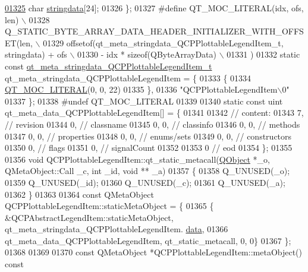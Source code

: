 \begin{DoxyCode}
\hypertarget{a00067_source_l01325}{}\hyperlink{a00067_a25e998eb002b6a9f9e969afa5247748f}{01325}     \textcolor{keywordtype}{char} \hyperlink{a00067_a25e998eb002b6a9f9e969afa5247748f}{stringdata}[24];
01326 \};
01327 \textcolor{preprocessor}{#define QT\_MOC\_LITERAL(idx, ofs, len) \(\backslash\)}
01328 \textcolor{preprocessor}{    Q\_STATIC\_BYTE\_ARRAY\_DATA\_HEADER\_INITIALIZER\_WITH\_OFFSET(len, \(\backslash\)}
01329 \textcolor{preprocessor}{    offsetof(qt\_meta\_stringdata\_QCPPlottableLegendItem\_t, stringdata) + ofs \(\backslash\)}
01330 \textcolor{preprocessor}{        - idx * sizeof(QByteArrayData) \(\backslash\)}
01331 \textcolor{preprocessor}{    )}
01332 \textcolor{keyword}{static} \textcolor{keyword}{const} \hyperlink{a00067_d3/de5/a00209}{qt\_meta\_stringdata\_QCPPlottableLegendItem\_t} 
      qt\_meta\_stringdata\_QCPPlottableLegendItem = \{
01333     \{
01334 \hyperlink{a00067_a75bb9482d242cde0a06c9dbdc6b83abe}{QT\_MOC\_LITERAL}(0, 0, 22)
01335     \},
01336     \textcolor{stringliteral}{"QCPPlottableLegendItem\(\backslash\)0"}
01337 \};
01338 \textcolor{preprocessor}{#undef QT\_MOC\_LITERAL}
01339 
01340 \textcolor{keyword}{static} \textcolor{keyword}{const} uint qt\_meta\_data\_QCPPlottableLegendItem[] = \{
01341 
01342  \textcolor{comment}{// content:}
01343        7,       \textcolor{comment}{// revision}
01344        0,       \textcolor{comment}{// classname}
01345        0,    0, \textcolor{comment}{// classinfo}
01346        0,    0, \textcolor{comment}{// methods}
01347        0,    0, \textcolor{comment}{// properties}
01348        0,    0, \textcolor{comment}{// enums/sets}
01349        0,    0, \textcolor{comment}{// constructors}
01350        0,       \textcolor{comment}{// flags}
01351        0,       \textcolor{comment}{// signalCount}
01352 
01353        0        \textcolor{comment}{// eod}
01354 \};
01355 
01356 \textcolor{keywordtype}{void} QCPPlottableLegendItem::qt\_static\_metacall(\hyperlink{a00059}{QObject} *\_o, QMetaObject::Call \_c, \textcolor{keywordtype}{int} \_id, \textcolor{keywordtype}{void} **
      \_a)
01357 \{
01358     Q\_UNUSED(\_o);
01359     Q\_UNUSED(\_id);
01360     Q\_UNUSED(\_c);
01361     Q\_UNUSED(\_a);
01362 \}
01363 
01364 \textcolor{keyword}{const} QMetaObject QCPPlottableLegendItem::staticMetaObject = \{
01365     \{ &QCPAbstractLegendItem::staticMetaObject, qt\_meta\_stringdata\_QCPPlottableLegendItem.
      \hyperlink{a00067_a56d928faacdea012d9b501b879ef98a8}{data},
01366       qt\_meta\_data\_QCPPlottableLegendItem,  qt\_static\_metacall, 0, 0\}
01367 \};
01368 
01369 
01370 \textcolor{keyword}{const} QMetaObject *QCPPlottableLegendItem::metaObject()\textcolor{keyword}{ const}

\end{DoxyCode}
